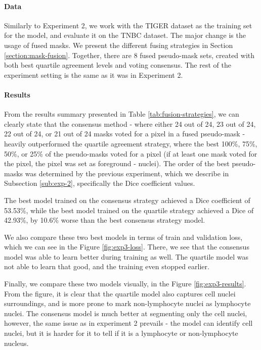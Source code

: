 \paragraph{Data}
Similarly to Experiment 2, we work with the TIGER dataset as the training set for the model, and evaluate it on the TNBC dataset. The major change is the usage of fused masks. We present the different fusing strategies in Section \ref{section:mask-fusion}. Together, there are 8 fused pseudo-mask sets, created with both best quartile agreement levels and voting consensus. The rest of the experiment setting is the same as it was in Experiment 2.

\paragraph{Results}
From the results summary presented in Table \ref{tab:fusion-strategies}, we can clearly state that the consensus method - where either 24 out of 24, 23 out of 24, 22 out of 24, or 21 out of 24 masks voted for a pixel in a fused pseudo-mask - heavily outperformed the quartile agreement strategy, where the best 100\%, 75\%, 50\%, or 25\% of the pseudo-masks voted for a pixel (if at least one mask voted for the pixel, the pixel was set as foreground - nuclei). The order of the best pseudo-masks was determined by the previous experiment, which we describe in Subsection \ref{sub:exp-2}, specifically the Dice coefficient values.

The best model trained on the consensus strategy achieved a Dice coefficient of 53.53\%, while the best model trained on the quartile strategy achieved a Dice of 42.93\%, by 10.6\% worse than the best consensus strategy model.

We also compare these two best models in terms of train and validation loss, which we can see in the Figure \ref{fig:exp3-loss}. There, we see that the consensus model was able to learn better during training as well. The quartile model was not able to learn that good, and the training even stopped earlier.

Finally, we compare these two models visually, in the Figure \ref{fig:exp3-results}. From the figure, it is clear that the quartile model also captures cell nuclei surroundings, and is more prone to mark non-lymphocyte nuclei as lymphocyte nuclei. The consensus model is much better at segmenting only the cell nuclei, however, the same issue as in experiment 2 prevails - the model can identify cell nuclei, but it is harder for it to tell if it is a lymphocyte or non-lymphocyte nucleus.

